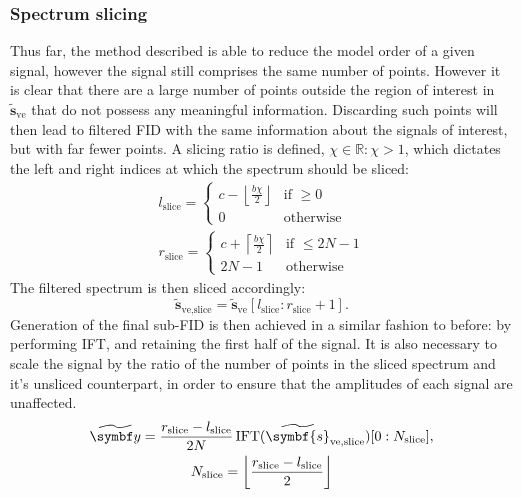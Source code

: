 \subsubsection{Spectrum slicing}
Thus far, the method described is able to reduce the model order of a given
signal, however the signal still comprises the same number of points. However
it is clear that there are a large number of points outside the region of
interest in $\widetilde{\symbf{s}}_{\text{ve}}$ that do not possess any
meaningful information. Discarding such points will then lead to filtered
\ac{FID} with the same information about the signals of interest, but with
far fewer points. A slicing ratio is defined, $\chi \in \mathbb{R}: \chi>
1$,
which dictates the left and right indices at which the spectrum should be
sliced:
\begin{subequations}
    \begin{gather}
        l_{\text{slice}} =
        \begin{cases}
            c - \left \lfloor \frac{b \chi}{2} \right \rfloor &
            \text{if } \geq 0 \\
            0 & \text{otherwise}
        \end{cases} \\
        r_{\text{slice}} =
        \begin{cases}
            c + \left \lceil \frac{b \chi}{2} \right \rceil &
            \text{if } \leq 2N - 1 \\
            2N - 1 & \text{otherwise}
        \end{cases}
    \end{gather}
\end{subequations}
The filtered spectrum is then sliced accordingly:
\begin{equation}
    \widetilde{\symbf{s}}_{\text{ve,slice}} =
        \widetilde{\symbf{s}}_{\text{ve}} [
            l_{\text{slice}} :
            r_{\text{slice}} + 1
        ].
\end{equation}
Generation of the final sub-\ac{FID} is then achieved in a similar fashion to
before: by performing \ac{IFT}, and retaining the first half of the signal.
It is also necessary to scale the signal by the ratio of the number of points
in the sliced spectrum and it's unsliced counterpart, in order to ensure that
the amplitudes of each signal are unaffected.
\begin{subequations}
    \begin{gather}
        \widetilde{\by} =
            \frac{r_{\text{slice}} - l_{\text{slice}}}{2N}
            \IFT(\widetilde{\symbf{s}}_{\text{ve,slice}})
            [0 : N_{\text{slice}}],\\
            N_{\text{slice}} = \left \lfloor \frac{r_{\text{slice}} - l_{\text{slice}}}{2} \right \rfloor
    \end{gather}
\end{subequations}
